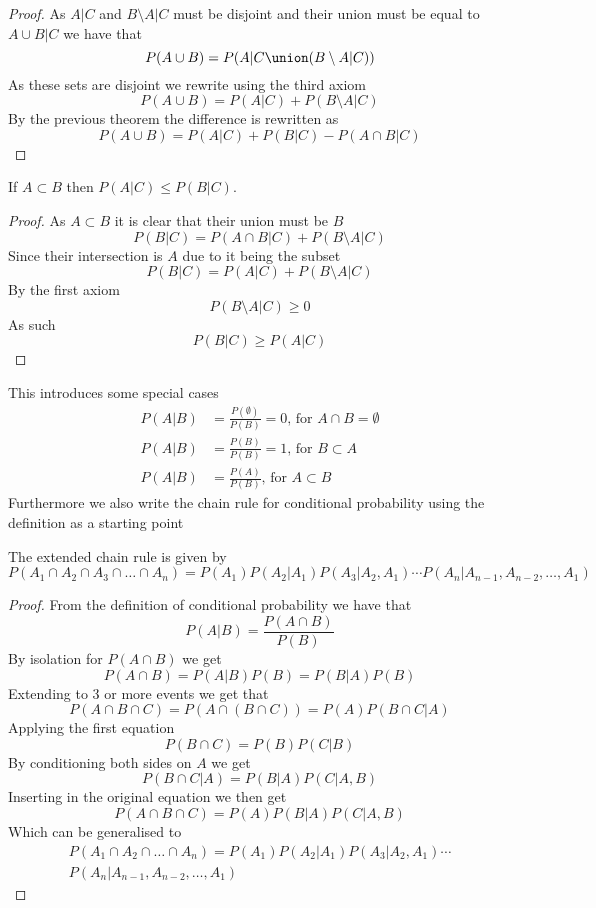 \begin{proof}
  As $A|C$ and $B\setminus A|C$ must be disjoint and their union must be equal to $A\cup B|C$ we have that
  \[
      P(A\cup B)=P(A|C\union (B\setminus A|C))
  \]
  As these sets are disjoint we rewrite using the third axiom
  \[
      P(A\cup B)=P(A|C)+P(B\setminus A|C)
  \]
  By the previous theorem the difference is rewritten as
  \[
      P(A\cup B)=P(A|C)+P(B|C)-P(A\cap B|C)
  \]
\end{proof}
\begin{theorem}
  If $A\subset B$ then $P(A|C)\leq P(B|C)$.
\end{theorem}
\begin{proof}
  As $A\subset B$ it is clear that their union must be $B$
  \[
      P(B|C)=P(A\cap B|C)+P(B\setminus A|C)
  \]
  Since their intersection is $A$ due to it being the subset
  \[
      P(B|C)=P(A|C)+P(B\setminus A|C)
  \]
  By the first axiom
  \[
      P(B\setminus A|C)\geq 0
  \]
  As such
  \[
      P(B|C)\geq P(A|C)
  \]
\end{proof}
This introduces some special cases
\begin{align*}
    P(A|B)&=\frac{P(\emptyset)}{P(B)}=0 \text{, for } A\cap B=\emptyset \\
    P(A|B)&=\frac{P(B)}{P(B)}=1 \text{, for } B\subset A \\
    P(A|B)&=\frac{P(A)}{P(B)} \text{, for } A\subset B
\end{align*}
Furthermore we also write the chain rule for conditional probability using the definition as a starting point
\begin{theorem}
  The extended chain rule is given by $P(A_{1}\cap A_{2}\cap A_{3}\cap\ldots\cap A_{n})=P(A_{1})P(A_{2}|A_{1})P(A_{3}|A_{2},A_{1})\cdots P(A_{n}|A_{n-1},A_{n-2},\ldots,A_{1})$
\end{theorem}
\begin{proof}
  From the definition of conditional probability we have that
  \[
      P(A|B)=\frac{P(A\cap B)}{P(B)}
  \]
  By isolation for $P(A\cap B)$ we get
  \[
      P(A\cap B)=P(A|B)P(B)=P(B|A)P(B)
  \]
  Extending to 3 or more events we get that
  \[
      P(A\cap B\cap C)=P(A\cap(B\cap C))=P(A)P(B\cap C|A)
  \]
  Applying the first equation
  \[
      P(B\cap C)=P(B)P(C|B)
  \]
  By conditioning both sides on $A$ we get
  \[
      P(B\cap C|A)=P(B|A)P(C|A,B)
  \]
  Inserting in the original equation we then get
  \[
      P(A\cap B\cap C)=P(A)P(B|A)P(C|A,B)
  \]
  Which can be generalised to
  \begin{equation*}
    \begin{gathered}
      P(A_{1}\cap A_{2}\cap\ldots\cap A_{n})=P(A_{1})P(A_{2}|A_{1})P(A_{3}|A_{2},A_{1})\cdots \\
      P(A_{n}|A_{n-1},A_{n-2},\ldots,A_{1})
    \end{gathered}
  \end{equation*}
\end{proof}
